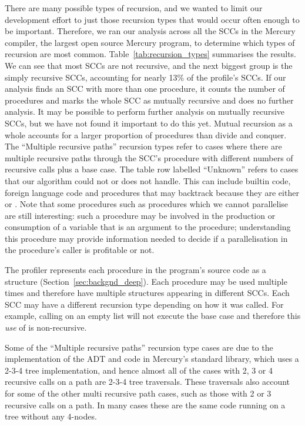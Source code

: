 There are many possible types of recursion,
and we wanted to limit our development effort to just those recursion types
that would occur often enough to be important.
Therefore,
we ran our analysis across all the SCCs in the Mercury compiler,
the largest open source Mercury program,
to determine which types of recursion are most common.
Table~\ref{tab:recursion_types} summarises the results.
We can see that most SCCs are not recursive,
and the next biggest group is the simply recursive SCCs,
accounting for nearly 13\% of the profile's SCCs.
If our analysis finds an SCC with more than one procedure,
it counts the number of procedures and marks the whole SCC as
mutually recursive and does no further analysis.
It may be possible to perform further analysis on mutually recursive SCCs,
but we have not found it important to do this yet.
Mutual recursion as a whole accounts for a larger proportion of procedures
than divide and conquer.
The ``Multiple recursive paths'' recursion types refer to cases where there
are multiple recursive paths through the SCC's procedure with different
numbers of recursive calls plus a base case.
The table row labelled ``Unknown'' refers to cases that our algorithm
could not or does not handle.
This can include builtin code, foreign language code and
procedures that may backtrack because they are either \dnondet or \dmulti.
Note that some procedures such as \dsemidet procedures which we cannot
parallelise are still interesting:
such a procedure may be involved in the production or consumption of a
variable that is an argument to the procedure;
understanding this procedure may provide information needed to
decide if a parallelisation in the procedure's caller is profitable or not.

The profiler represents each procedure in the program's source code as a \PS
structure (Section~\ref{sec:backgnd_deep}).
Each procedure may be used multiple times and therefore have multiple \PD
structures appearing in different SCCs.
Each SCC may have a different recursion type depending on how it was called.
For example, calling  on an empty list will not execute the base
case and therefore this \emph{use} of  is non-recursive.

Some of the ``Multiple recursive paths'' recursion type cases are due to the
implementation of the  ADT and code in Mercury's standard library,
which uses a 2-3-4 tree implementation,
and hence almost all of the cases with 2, 3 or 4 recursive calls on a path
are 2-3-4 tree traversals.
These traversals also account for some of the other multi recursive path
cases,
such as those with 2 or 3 recursive calls on a path.
In many cases these are the same code running on a tree without any 4-nodes.


